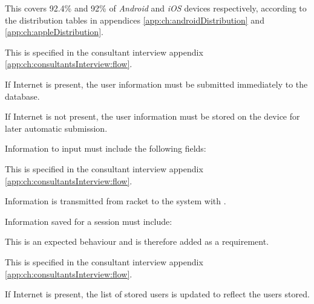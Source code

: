 This covers 92.4\% and 92\% of \textit{Android} and \textit{iOS} devices respectively, according to the distribution tables in appendices \ref{app:ch:androidDistribution} and \ref{app:ch:appleDistribution}.


This  is specified in the consultant interview appendix \ref{app:ch:consultantsInterview:flow}.

If Internet is present, the user information must be submitted immediately to the database.

If Internet is not present, the user information must be stored on the device for later automatic submission.

Information to input must include the following fields:\newline
{}


This  is specified in the consultant interview appendix \ref{app:ch:consultantsInterview:flow}.

Information is transmitted from racket to the system with .

Information saved for a session must include: \newline
{}


This is an expected behaviour and is therefore added as a requirement.


This  is specified in the consultant interview appendix \ref{app:ch:consultantsInterview:flow}.

If Internet is present, the list of stored users is updated to reflect the users stored.

